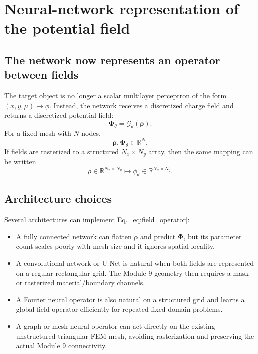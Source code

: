 \documentclass[11pt]{article}
\begin{document}
\section{Neural-network representation of the potential field}

\subsection{The network now represents an operator between fields}

The target object is no longer a scalar multilayer perceptron of the form $(x,y,\mu)\mapsto\phi$. Instead, the network receives a discretized charge field and returns a discretized potential field:
\begin{equation}
\bm{\Phi}_{\theta}=\mathcal{G}_{\theta}(\bm{\rho}).
\end{equation}
For a fixed mesh with $N$ nodes,
\begin{equation}
\bm{\rho},\bm{\Phi}_{\theta}\in\mathbb{R}^{N}.
\end{equation}
If fields are rasterized to a structured $N_x\times N_y$ array, then the same mapping can be written
\begin{equation}
\rho\in\mathbb{R}^{N_x\times N_y}
\longmapsto
\phi_{\theta}\in\mathbb{R}^{N_x\times N_y}.
\end{equation}

\subsection{Architecture choices}

Several architectures can implement Eq.~\eqref{eq:field_operator}:
\begin{itemize}[leftmargin=2em]
    \item A fully connected network can flatten $\bm{\rho}$ and predict $\bm{\Phi}$, but its parameter count scales poorly with mesh size and it ignores spatial locality.
    \item A convolutional network or U-Net is natural when both fields are represented on a regular rectangular grid. The Module 9 geometry then requires a mask or rasterized material/boundary channels.
    \item A Fourier neural operator is also natural on a structured grid and learns a global field operator efficiently for repeated fixed-domain problems.
    \item A graph or mesh neural operator can act directly on the existing unstructured triangular FEM mesh, avoiding rasterization and preserving the actual Module 9 connectivity.
\end{itemize}
\end{document}

